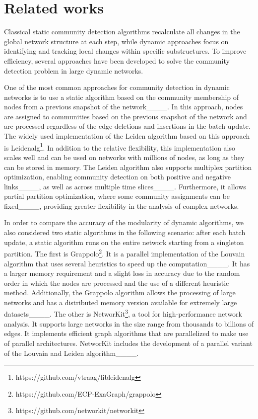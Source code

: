 \section{Related works}
\label{S:2}
Classical static community detection algorithms recalculate all changes in the global network structure at each step, while dynamic approaches focus on identifying and tracking local changes within specific substructures. To improve efficiency, several approaches have been developed to solve the community detection problem in large dynamic networks.

One of the most common approaches for community detection in dynamic networks is to use a static algorithm based on the community membership of nodes from a previous snapshot of the network____. In this approach, nodes are assigned to communities based on the previous snapshot of the network and are processed regardless of the edge deletions and insertions in the batch update. The widely used implementation of the Leiden algorithm based on this approach is Leidenalg\footnote{https://github.com/vtraag/libleidenalg}. In addition to the relative flexibility, this implementation also scales well and can be used on networks with millions of nodes, as long as they can be stored in memory. The Leiden algorithm also supports multiplex partition optimization, enabling community detection on both positive and negative links____, as well as across multiple time slices____. Furthermore, it allows partial partition optimization, where some community assignments can be fixed____, providing greater flexibility in the analysis of complex networks.

In order to compare the accuracy of the modularity of dynamic algorithms, we also considered two static algorithms in the following scenario: after each batch update, a static algorithm runs on the entire network starting from a singleton partition. The first is Grappolo\footnote{https://github.com/ECP-ExaGraph/grappolo}. It is a parallel implementation of the Louvain algorithm that uses several heuristics to speed up the computation____. It has a larger memory requirement and a slight loss in accuracy due to the random order in which the nodes are processed and the use of a different heuristic method. Additionally, the Grappolo algorithm allows the processing of large networks and has a distributed memory version available for extremely large datasets____. The other is NetworKit\footnote{https://github.com/networkit/networkit}, a tool for high-performance network analysis. It supports large networks in the size range from thousands to billions of edges. It implements efficient graph algorithms that are parallelized to make use of parallel architectures. NetworKit includes the development of a parallel variant of the Louvain and Leiden algorithm____.

